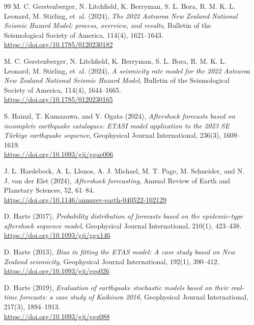 \documentclass[12pt,letterpaper]{article}
\begin{document}
\begin{thebibliography}{99}
M. C. Gerstenberger, N. Litchfield, K. Berryman, S. L. Bora,
R. M. K. L. Leonard, M. Stirling, et~al. (2024),
\emph{The 2022 Aotearoa New Zealand National Seismic Hazard Model:
process, overview, and results},
Bulletin of the Seismological Society of America, 114(4), 1621--1643.\\
\url{https://doi.org/10.1785/0120230182}

M. C. Gerstenberger, N. Litchfield, K. Berryman, S. L. Bora,
R. M. K. L. Leonard, M. Stirling, et~al. (2024),
\emph{A seismicity rate model for the 2022 Aotearoa New Zealand National
Seismic Hazard Model},
Bulletin of the Seismological Society of America, 114(4), 1644--1665.\\
\url{https://doi.org/10.1785/0120230165}

S. Hainzl, T. Kumazawa, and Y. Ogata (2024),
\emph{Aftershock forecasts based on incomplete earthquake catalogues:
ETASI model application to the 2023 SE T\"urkiye earthquake sequence},
Geophysical Journal International, 236(3), 1609--1619.\\
\url{https://doi.org/10.1093/gji/ggae006}

J. L. Hardebeck, A. L. Llenos, A. J. Michael, M. T. Page, M. Schneider, and
N. J. van der Elst (2024),
\emph{Aftershock forecasting},
Annual Review of Earth and Planetary Sciences, 52, 61--84.\\
\url{https://doi.org/10.1146/annurev-earth-040522-102129}

D. Harte (2017),
\emph{Probability distribution of forecasts based on the epidemic-type
aftershock sequence model},
Geophysical Journal International, 210(1), 423--438.\\
\url{https://doi.org/10.1093/gji/ggx146}

D. Harte (2013),
\emph{Bias in fitting the ETAS model: A case study based on New Zealand
seismicity},
Geophysical Journal International, 192(1), 390--412.\\
\url{https://doi.org/10.1093/gji/ggs026}

D. Harte (2019),
\emph{Evaluation of earthquake stochastic models based on their real-time
forecasts: a case study of Kaik\={o}ura 2016},
Geophysical Journal International, 217(3), 1894--1913.\\
\url{https://doi.org/10.1093/gji/ggz088}


\end{thebibliography}
\end{document}

